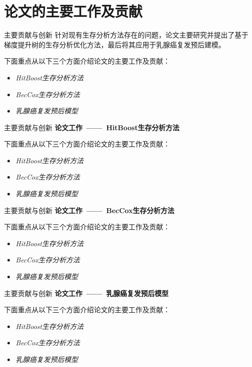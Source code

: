 \documentclass[10pt]{beamer}
\begin{document}
\section{论文的主要工作及贡献}

\begin{frame}{主要贡献与创新}
  针对现有生存分析方法存在的问题，论文主要研究并提出了基于梯度提升树的生存分析优化方法，最后将其应用于乳腺癌复发预后建模。

  下面重点从以下三个方面介绍论文的主要工作及贡献：
  \begin{itemize}
    \item \textit{HitBoost生存分析方法}
    \item \textit{BecCox生存分析方法}
    \item \textit{乳腺癌复发预后模型}
  \end{itemize}
\end{frame}

\begin{frame}{主要贡献与创新}
  \textbf{论文工作\ ——\ HitBoost生存分析方法}

  下面重点从以下三个方面介绍论文的主要工作及贡献：
  \begin{itemize}
    \item \textit{HitBoost生存分析方法}
    \item \textit{BecCox生存分析方法}
    \item \textit{乳腺癌复发预后模型}
  \end{itemize}
\end{frame}

\begin{frame}{主要贡献与创新}
  \textbf{论文工作\ ——\ BecCox生存分析方法}

  下面重点从以下三个方面介绍论文的主要工作及贡献：
  \begin{itemize}
    \item \textit{HitBoost生存分析方法}
    \item \textit{BecCox生存分析方法}
    \item \textit{乳腺癌复发预后模型}
  \end{itemize}
\end{frame}

\begin{frame}{主要贡献与创新}
  \textbf{论文工作\ ——\ 乳腺癌复发预后模型}

  下面重点从以下三个方面介绍论文的主要工作及贡献：
  \begin{itemize}
    \item \textit{HitBoost生存分析方法}
    \item \textit{BecCox生存分析方法}
    \item \textit{乳腺癌复发预后模型}
  \end{itemize}
\end{frame}
\end{document}
